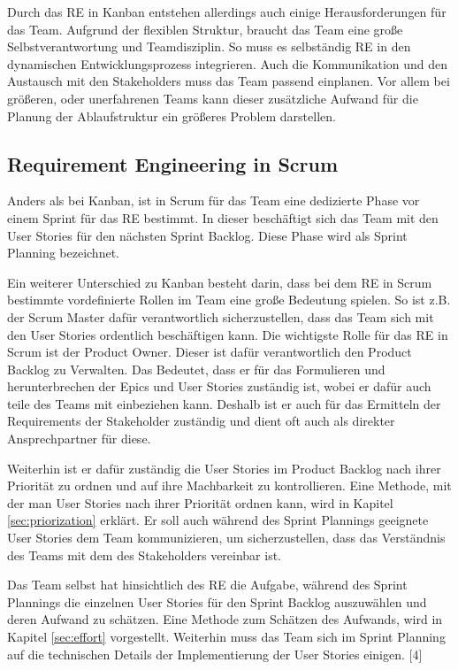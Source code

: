 \documentclass[acmtog]{acmart}
\begin{document}
Durch das RE in Kanban entstehen allerdings auch einige Herausforderungen für das Team. Aufgrund der flexiblen 
Struktur, braucht das Team eine große Selbstverantwortung und Teamdisziplin. So muss es selbständig RE in den 
dynamischen Entwicklungsprozess integrieren. Auch die Kommunikation und den Austausch mit den Stakeholders muss 
das Team passend einplanen. Vor allem bei größeren, oder unerfahrenen Teams kann dieser zusätzliche Aufwand für 
die Planung der Ablaufstruktur ein größeres Problem darstellen. \cite{kanbannod}

\subsection{Requirement Engineering in Scrum}

Anders als bei Kanban, ist in Scrum für das Team eine dedizierte Phase vor einem Sprint für das RE bestimmt. In dieser 
beschäftigt sich das Team mit den User Stories für den nächsten Sprint Backlog. Diese Phase wird als Sprint Planning bezeichnet. \cite{reinscrum}

Ein weiterer Unterschied zu Kanban besteht darin, dass bei dem RE in Scrum bestimmte vordefinierte Rollen im Team eine 
große Bedeutung spielen. So ist z.B. der Scrum Master dafür verantwortlich sicherzustellen, dass das Team sich mit den 
User Stories ordentlich beschäftigen kann. Die wichtigste Rolle für das RE in Scrum ist der Product Owner. Dieser ist 
dafür verantwortlich den Product Backlog zu Verwalten. Das Bedeutet, dass er für das Formulieren und herunterbrechen der 
Epics und User Stories zuständig ist, wobei er dafür auch teile des Teams mit einbeziehen kann. Deshalb ist er auch für 
das Ermitteln der Requirements der Stakeholder zuständig und dient oft auch als direkter Ansprechpartner für diese. \cite{reinscrum}

Weiterhin ist er dafür zuständig die User Stories im Product Backlog nach ihrer Priorität zu ordnen und auf ihre Machbarkeit 
zu kontrollieren. Eine Methode, mit der man User Stories nach ihrer Priorität ordnen kann, wird in Kapitel \ref{sec:priorization} erklärt. 
Er soll auch während des Sprint Plannings geeignete User Stories dem Team kommunizieren, um sicherzustellen, dass das Verständnis 
des Teams mit dem des Stakeholders vereinbar ist. \cite{reinscrum}

Das Team selbst hat hinsichtlich des RE die Aufgabe, während des Sprint Plannings die einzelnen User Stories für den Sprint 
Backlog auszuwählen und deren Aufwand zu schätzen. Eine Methode zum Schätzen des Aufwands, wird in Kapitel \ref{sec:effort} vorgestellt. 
Weiterhin muss das Team sich im Sprint Planning auf die technischen Details der Implementierung der User Stories einigen. [4]
\end{document}
